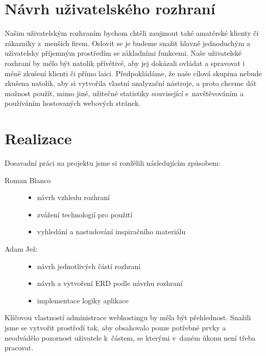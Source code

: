 \documentclass[11pt,a4paper]{article}
\begin{document}
  \section{Návrh uživatelského rozhraní}

    Našim uživatelským rozhraním bychom chtěli zaujmout také amatérské
    klienty či zákazníky z~menších firem. Oslovit se je budeme snažit
    hlavně jednoduchým a uživatelsky příjemným prostředím se základními
    funkcemi. Naše uživatelské rozhraní by mělo být natolik přívětivé, aby
    jej dokázali ovládat a spravovat i méně zkušení klienti či přímo laici.
    Předpokládáme, že naše cílová skupina nebude zkušena natolik, aby si
    vytvořila vlastní analyzační nástroje, a proto chceme dát možnost použít,
    mimo jiné, užitečné statistiky související s~navštěvováním a používáním
    hostovaných webových stránek.

  \section{Realizace}

    Dosavadní práci na projektu jsme si rozdělili následujícím způsobem:
    \begin{description}
      \item[Roman Blanco] \hfill
        \begin{itemize}
          \item návrh vzhledu rozhraní
          \item zvážení technologií pro použití
          \item vyhledání a nastudování inspiračního materiálu
        \end{itemize}
      \item[Adam Jež:] \hfill
        \begin{itemize}
          \item návrh jednotlivých částí rozhraní
          \item návrh a vytvoření ERD podle návrhu rozhraní
          \item implementace logiky aplikace
        \end{itemize}
    \end{description}

    Klíčovou vlastností administrace webhostingu by měla být přehlednost.
    Snažili jsme se vytvořit prostředí tak, aby obsahovalo pouze potřebné
    prvky a neodvádělo pozornost uživatele k~částem, se kterými v~daném úkonu
    není třeba pracovat.
\end{document}
